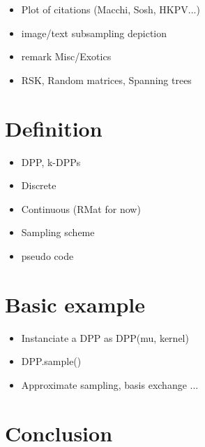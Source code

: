 \documentclass[twoside,11pt]{article}
\begin{document}
  \begin{itemize}
    \item Plot of citations (Macchi, Sosh, HKPV...)
    \item image/text subsampling depiction
    \item remark Misc/Exotics
    \item RSK, Random matrices, Spanning trees
  \end{itemize}





\section{Definition} %
\label{sec:definition}

  \begin{itemize}
    \item DPP, k-DPPs
    \item Discrete
    \item Continuous (RMat for now)
    \item Sampling scheme
    \item pseudo code
  \end{itemize}



\section{Basic example} %
\label{sec:basic_example}

  \begin{itemize}
    \item Instanciate a DPP as DPP(mu, kernel)
    \item DPP.sample()
    \item Approximate sampling, basis exchange ...
  \end{itemize}


\section{Conclusion} %
\label{sec:conclusion}

\end{document}
